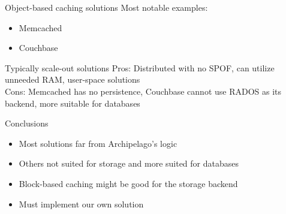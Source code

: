 \begin{frame}{Object-based caching solutions}
	Most notable examples:
	\begin{itemize}
		\item Memcached
		\item Couchbase
	\end{itemize}
	\dspc
	Typically scale-out solutions
	\dspc
	Pros: Distributed with no SPOF, can utilize unneeded RAM, user-space 
	solutions\\
	Cons: Memcached has no persistence, Couchbase cannot use RADOS as its 
	backend, more suitable for databases
\end{frame}

\begin{frame}{Conclusions}

	\begin{itemize}
		\item Most solutions far from Archipelago's logic
		\item Others not suited for storage and more suited for 
			databases
		\item Block-based caching might be good for the storage backend
		\item Must implement our own solution
	\end{itemize}

\end{frame}
	

